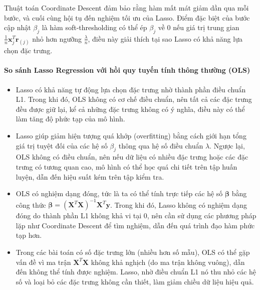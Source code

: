 Thuật toán Coordinate Descent đảm bảo rằng hàm mất mát giảm dần qua mỗi bước, và cuối cùng hội tụ đến nghiệm tối ưu của Lasso. Điểm đặc biệt của bước cập nhật \( \beta_j \) là hàm soft-thresholding có thể ép \( \beta_j \) về 0 nếu giá trị trung gian \( \frac{1}{n} \mathbf{x}_j^T \mathbf{r}_{(j)} \) nhỏ hơn ngưỡng \( \frac{\lambda}{n} \), điều này giải thích tại sao Lasso có khả năng lựa chọn đặc trưng.

\paragraph{So sánh Lasso Regression với hồi quy tuyến tính thông thường (OLS)}

\begin{itemize}
    \item  Lasso có khả năng tự động lựa chọn đặc trưng nhờ thành phần điều chuẩn L1. Trong khi đó, OLS không có cơ chế điều chuẩn, nên tất cả các đặc trưng đều được giữ lại, kể cả những đặc trưng không có ý nghĩa, điều này có thể làm tăng độ phức tạp của mô hình.
    
    \item Lasso giúp giảm hiện tượng quá khớp (overfitting) bằng cách giới hạn tổng giá trị tuyệt đối của các hệ số \( \beta_j \) thông qua hệ số điều chuẩn $\lambda$. Ngược lại, OLS không có điều chuẩn, nên nếu dữ liệu có nhiều đặc trưng hoặc các đặc trưng có tương quan cao, mô hình có thể học quá chi tiết trên tập huấn luyện, dẫn đến hiệu suất kém trên tập kiểm tra.
    
    \item  OLS có nghiệm dạng đóng, tức là ta có thể tính trực tiếp các hệ số \( \boldsymbol{\beta} \) bằng công thức \( \boldsymbol{\beta} = (\mathbf{X}^T \mathbf{X})^{-1} \mathbf{X}^T \mathbf{y} \). Trong khi đó, Lasso không có nghiệm dạng đóng do thành phần L1 không khả vi tại 0, nên cần sử dụng các phương pháp lặp như Coordinate Descent để tìm nghiệm, dẫn đến quá trình đạo hàm phức tạp hơn.
    
    \item  Trong các bài toán có số đặc trưng lớn (nhiều hơn số mẫu), OLS có thể gặp vấn đề vì ma trận \( \mathbf{X}^T \mathbf{X} \) không khả nghịch (do ma trận không vuông), dẫn đến không thể tính được nghiệm. Lasso, nhờ điều chuẩn L1 nó thu nhỏ các hệ số và loại bỏ các đặc trưng không cần thiết, làm giảm chiều dữ liệu hiệu quả.
\end{itemize}


